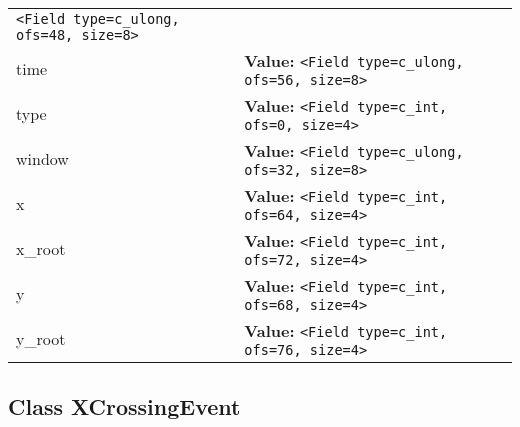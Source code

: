 \begin{longtable}{|p{\varnamewidth}|p{\vardescrwidth}|l}
{\tt {\textless}Field type=c\_ulong, ofs=48, size=8{\textgreater}}&\\
\cline{1-2}
\raggedright t\-i\-m\-e\- & \raggedright \textbf{Value:} 
{\tt {\textless}Field type=c\_ulong, ofs=56, size=8{\textgreater}}&\\
\cline{1-2}
\raggedright t\-y\-p\-e\- & \raggedright \textbf{Value:} 
{\tt {\textless}Field type=c\_int, ofs=0, size=4{\textgreater}}&\\
\cline{1-2}
\raggedright w\-i\-n\-d\-o\-w\- & \raggedright \textbf{Value:} 
{\tt {\textless}Field type=c\_ulong, ofs=32, size=8{\textgreater}}&\\
\cline{1-2}
\raggedright x\- & \raggedright \textbf{Value:} 
{\tt {\textless}Field type=c\_int, ofs=64, size=4{\textgreater}}&\\
\cline{1-2}
\raggedright x\-\_\-r\-o\-o\-t\- & \raggedright \textbf{Value:} 
{\tt {\textless}Field type=c\_int, ofs=72, size=4{\textgreater}}&\\
\cline{1-2}
\raggedright y\- & \raggedright \textbf{Value:} 
{\tt {\textless}Field type=c\_int, ofs=68, size=4{\textgreater}}&\\
\cline{1-2}
\raggedright y\-\_\-r\-o\-o\-t\- & \raggedright \textbf{Value:} 
{\tt {\textless}Field type=c\_int, ofs=76, size=4{\textgreater}}&\\
\cline{1-2}
\end{longtable}



\subsection{Class XCrossingEvent}

